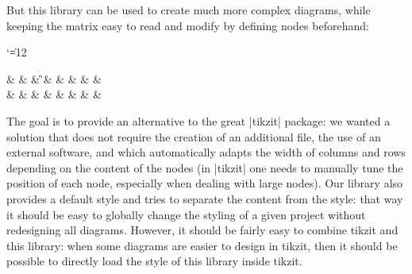 \documentclass[a4paper,doc2]{ltxdoc} %
\begin{document}
But this library can be used to create much more complex diagrams, while keeping the matrix easy to read and modify by defining nodes beforehand:
{\catcode`\|=12 %
\begin{codeexample}[width=0pt]
  \begin{ZX}
    \Filter           &         & \Verif & \G &          &              &      &     & \\[\zxZeroRow-1mm]
    \InterfaceParties & \FwIfFx & \XiH   &    & \XiSigma & \FwIfNoAbort & \PiH & \Cr & \MultipleParties
  \end{ZX}
\end{codeexample}
}

The goal is to provide an alternative to the great |tikzit| package: we wanted a solution that does not require the creation of an additional file, the use of an external software, and which automatically adapts the width of columns and rows depending on the content of the nodes (in |tikzit| one needs to manually tune the position of each node, especially when dealing with large nodes). Our library also provides a default style and tries to separate the content from the style: that way it should be easy to globally change the styling of a given project without redesigning all diagrams. However, it should be fairly easy to combine tikzit and this library: when some diagrams are easier to design in tikzit, then it should be possible to directly load the style of this library inside tikzit.
\end{document}
